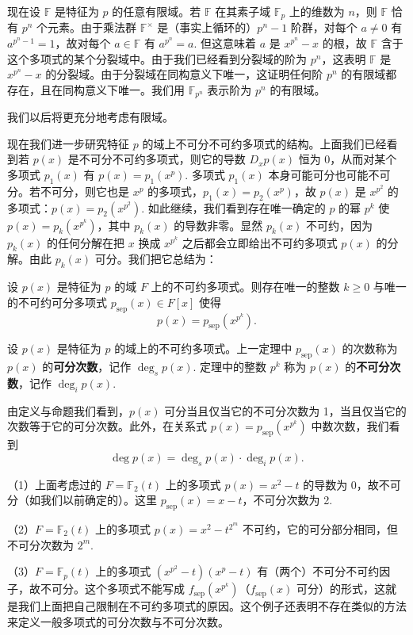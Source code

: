 现在设 \(\mathbb{F}\) 是特征为 \(p\) 的任意有限域。若 \(\mathbb{F}\) 在其素子域 \(\mathbb{F}_p\) 上的维数为 \(n\)，则 \(\mathbb{F}\) 恰有 \(p^n\) 个元素。由于乘法群 \(\mathbb{F}^\times\) 是（事实上循环的）\(p^n-1\) 阶群，对每个 \(a \neq 0\) 有 \(a^{p^n-1} = 1\)，故对每个 \(a \in \mathbb{F}\) 有 \(a^{p^n} = a\). 但这意味着 \(a\) 是 \(x^{p^n}-x\) 的根，故 \(\mathbb{F}\) 含于这个多项式的某个分裂域中。由于我们已经看到分裂域的阶为 \(p^n\)，这表明 \(\mathbb{F}\) 是 \(x^{p^n}-x\) 的分裂域。由于分裂域在同构意义下唯一，这证明任何阶 \(p^n\) 的有限域都存在，且在同构意义下唯一。我们用 \(\mathbb{F}_{p^n}\) 表示阶为 \(p^n\) 的有限域。

我们以后将更充分地考虑有限域。

现在我们进一步研究特征 \(p\) 的域上不可分不可约多项式的结构。上面我们已经看到若 \(p(x)\) 是不可分不可约多项式，则它的导数 \(D_xp(x)\) 恒为 0，从而对某个多项式 \(p_1(x)\) 有 \(p(x) = p_1(x^p)\). 多项式 \(p_1(x)\) 本身可能可分也可能不可分。若不可分，则它也是 \(x^p\) 的多项式，\(p_1(x) = p_2(x^p)\)，故 \(p(x)\) 是 \(x^{p^2}\) 的多项式：\(p(x) = p_2(x^{p^2})\). 如此继续，我们看到存在唯一确定的 \(p\) 的幂 \(p^k\) 使 \(p(x) = p_k(x^{p^k})\)，其中 \(p_k(x)\) 的导数非零。显然 \(p_k(x)\) 不可约，因为 \(p_k(x)\) 的任何分解在把 \(x\) 换成 \(x^{p^k}\) 之后都会立即给出不可约多项式 \(p(x)\) 的分解。由此 \(p_k(x)\) 可分。我们把它总结为：

\begin{proposition}\label{pro:13.38}
设 \(p(x)\) 是特征为 \(p\) 的域 \(F\) 上的不可约多项式。则存在唯一的整数 \(k \geq 0\) 与唯一的不可约可分多项式 \(p_{\mathrm{sep}}(x) \in F[x]\) 使得
\[
p(x) = p_{\mathrm{sep}}(x^{p^k}).
\]
\end{proposition}

\begin{definition}
设 \(p(x)\) 是特征为 \(p\) 的域上的不可约多项式。上一定理中 \(p_{\mathrm{sep}}(x)\) 的次数称为 \(p(x)\) 的\textbf{可分次数}，记作 \(\deg_s p(x)\). 定理中的整数 \(p^k\) 称为 \(p(x)\) 的\textbf{不可分次数}，记作 \(\deg_i p(x)\).
\end{definition}

由定义与命题我们看到，\(p(x)\) 可分当且仅当它的不可分次数为 1，当且仅当它的次数等于它的可分次数。此外，在关系式 \(p(x) = p_{\mathrm{sep}}(x^{p^k})\) 中数次数，我们看到
\[
\deg p(x) = \deg_s p(x) \cdot \deg_i p(x).
\]

\begin{example}
（1）上面考虑过的 \(F = \mathbb{F}_2(t)\) 上的多项式 \(p(x) = x^2-t\) 的导数为 0，故不可分（如我们以前确定的）。这里 \(p_{\mathrm{sep}}(x) = x-t\)，不可分次数为 2.

（2）\(F = \mathbb{F}_2(t)\) 上的多项式 \(p(x) = x^2-t^{2^m}\) 不可约，它的可分部分相同，但不可分次数为 \(2^m\).

（3）\(F = \mathbb{F}_p(t)\) 上的多项式 \((x^{p^2}-t)(x^p-t)\) 有（两个）不可分不可约因子，故不可分。这个多项式不能写成 \(f_{\mathrm{sep}}(x^{p^k})\)（\(f_{\mathrm{sep}}(x)\) 可分）的形式，这就是我们上面把自己限制在不可约多项式的原因。这个例子还表明不存在类似的方法来定义一般多项式的可分次数与不可分次数。
\end{example}

